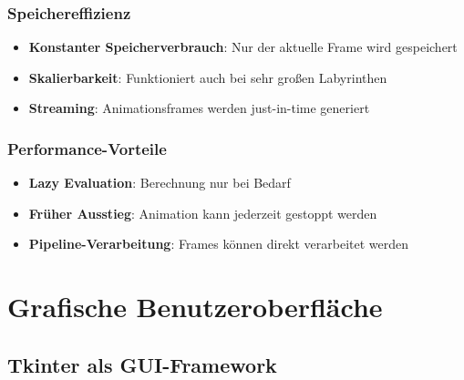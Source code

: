 \documentclass[12pt,a4paper]{article}
\begin{document}
\subsubsection{Speichereffizienz}
\begin{itemize}
    \item \textbf{Konstanter Speicherverbrauch}: Nur der aktuelle Frame wird gespeichert
    \item \textbf{Skalierbarkeit}: Funktioniert auch bei sehr großen Labyrinthen
    \item \textbf{Streaming}: Animationsframes werden just-in-time generiert
\end{itemize}

\subsubsection{Performance-Vorteile}
\begin{itemize}
    \item \textbf{Lazy Evaluation}: Berechnung nur bei Bedarf
    \item \textbf{Früher Ausstieg}: Animation kann jederzeit gestoppt werden
    \item \textbf{Pipeline-Verarbeitung}: Frames können direkt verarbeitet werden
\end{itemize}

    
    

\section{Grafische Benutzeroberfläche}

\subsection{Tkinter als GUI-Framework}
\end{document}
